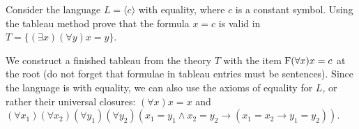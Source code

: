 \begin{problem}
\begin{solution}
    \end{solution}

\end{problem}


\begin{problem}

    Consider the language $L=\langle c\rangle$ with equality, where $c$ is a constant symbol. Using the tableau method prove that the formula $x=c$ is valid in $T=\{(\exists x)(\forall y)x=y\}$.

    \begin{solution}

        We construct a finished tableau from the theory $T$ with the item $\mathrm{F}(\forall x)x=c$ at the root (do not forget that formulae in tableau entries must be sentences). Since the language is with equality, we can also use the axioms of equality for $L$, or rather their universal closures: $(\forall x)x=x$ and $(\forall x_1)(\forall x_2)(\forall y_1)(\forall y_2)(x_1=y_1\wedge x_2=y_2\to (x_1=x_2\to y_1=y_2))$.


\end{solution}
\end{problem}
